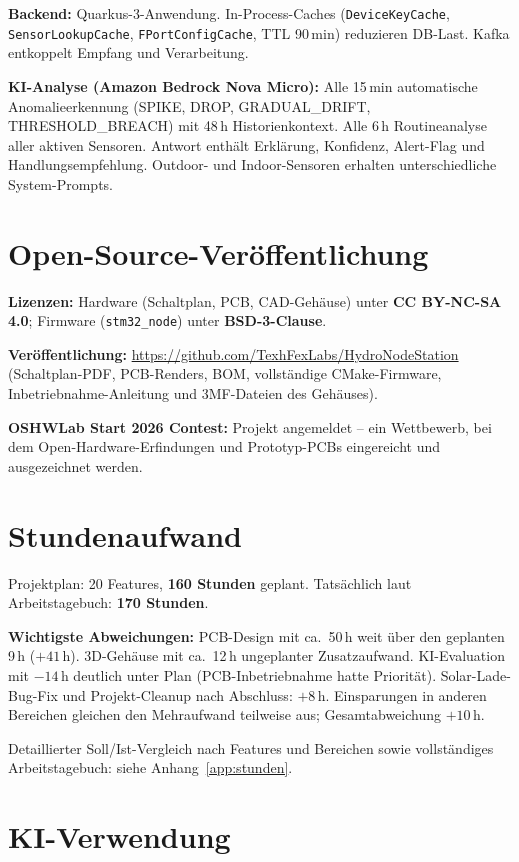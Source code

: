 \documentclass[11pt,a4paper]{scrartcl}
\begin{document}
\textbf{Backend:} Quarkus-3-Anwendung. In-Process-Caches (\texttt{DeviceKeyCache}, \texttt{SensorLookupCache}, \texttt{FPortConfigCache}, TTL 90\,min) reduzieren DB-Last. Kafka entkoppelt Empfang und Verarbeitung.

\textbf{KI-Analyse (Amazon Bedrock Nova Micro):} Alle 15\,min automatische Anomalieerkennung (SPIKE, DROP, GRADUAL\_DRIFT, THRESHOLD\_BREACH) mit 48\,h Historienkontext. Alle 6\,h Routineanalyse aller aktiven Sensoren. Antwort enthält Erklärung, Konfidenz, Alert-Flag und Handlungsempfehlung. Outdoor- und Indoor-Sensoren erhalten unterschiedliche System-Prompts.

\clearpage
\section{Open-Source-Veröffentlichung}

\textbf{Lizenzen:} Hardware (Schaltplan, PCB, CAD-Gehäuse) unter \textbf{CC BY-NC-SA 4.0}; Firmware (\texttt{stm32\_node}) unter \textbf{BSD-3-Clause}.

\textbf{Veröffentlichung:} \url{https://github.com/TexhFexLabs/HydroNodeStation} (Schaltplan-PDF, PCB-Renders, BOM, vollständige CMake-Firmware, Inbetriebnahme-Anleitung und 3MF-Dateien des Gehäuses).

\textbf{OSHWLab Start 2026 Contest:} Projekt angemeldet – ein Wettbewerb, bei dem Open-Hardware-Erfindungen und Prototyp-PCBs eingereicht und ausgezeichnet werden.

\section{Stundenaufwand}

Projektplan: 20 Features, \textbf{160 Stunden} geplant. Tatsächlich laut Arbeitstagebuch: \textbf{170 Stunden}.

\textbf{Wichtigste Abweichungen:} PCB-Design mit ca.~50\,h weit über den geplanten 9\,h ($+41\,\text{h}$). 3D-Gehäuse mit ca.~12\,h ungeplanter Zusatzaufwand. KI-Evaluation mit $-14\,\text{h}$ deutlich unter Plan (PCB-Inbetriebnahme hatte Priorität). Solar-Lade-Bug-Fix und Projekt-Cleanup nach Abschluss: $+8\,\text{h}$. Einsparungen in anderen Bereichen gleichen den Mehraufwand teilweise aus; Gesamtabweichung $+10\,\text{h}$.

Detaillierter Soll/Ist-Vergleich nach Features und Bereichen sowie vollständiges Arbeitstagebuch: siehe Anhang~\ref{app:stunden}.

\section{KI-Verwendung}
\end{document}
